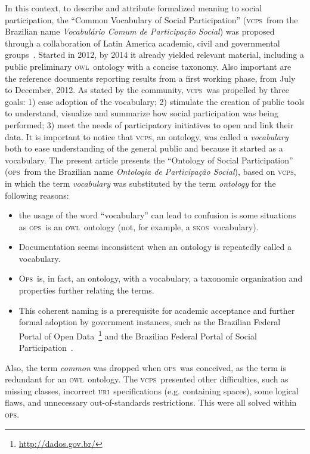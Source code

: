 \documentclass[10pt,letterpaper]{article}
\newcommand{\ops}{\textsc{ops}}
\newcommand{\opsi}{O\textsc{ps}}
\newcommand{\vcps}{\textsc{vcps}}
\newcommand{\owl}{\textsc{owl}}
\newcommand{\skos}{\textsc{skos}}
\newcommand{\uri}{\textsc{uri}}
\begin{document}
In this context, to describe and attribute formalized meaning to
social participation,
the ``Common Vocabulary of Social Participation''
(\vcps\ from the Brazilian name \emph{Vocabul\'ario Comum de Participa\c{c}\~ao Social})
was proposed through a collaboration of Latin America academic, civil and governmental groups~\cite{corais}.
Started in 2012, by 2014
it already yielded relevant material, including a public preliminary \owl\ ontology with a concise taxonomy.
Also important are the reference documents reporting results from a first working phase, from July to December, 2012. 
As stated by the community, \vcps\ was propelled by three goals:
1) ease adoption of the vocabulary;
2) stimulate the creation of public tools to understand, visualize and summarize how social participation was being performed;
3) meet the needs of participatory initiatives to open and link their data. 
It is important to notice that \vcps,
an ontology, was called a \emph{vocabulary} both to ease understanding of the general public and because it started as a vocabulary.
The present article presents the ``Ontology of Social Participation'' 
(\ops\ from the Brazilian name \emph{Ontologia de Participa\c{c}\~ao Social}),
based on \vcps, in which the term \emph{vocabulary} was substituted by the term \emph{ontology} for the following reasons:
\begin{itemize}
    \item the usage of the word ``vocabulary'' can lead to confusion is some situations as \ops\ is an \owl\ ontology
    (not, for example, a \skos\ vocabulary).
    \item Documentation seems inconsistent when an ontology is repeatedly called a vocabulary.
    \item \opsi\ is, in fact, an ontology, with a vocabulary,
    a taxonomic organization and properties further relating the terms.
    \item This coherent naming is a prerequisite for academic acceptance and further formal adoption by government instances,
    such as the Brazilian Federal Portal of Open Data~\footnote{\url{http://dados.gov.br/}} and the Brazilian Federal Portal of Social Participation~\cite{participa}.
\end{itemize}

\noindent Also, the term \emph{common} was dropped when \ops\ was conceived,
as the term is redundant for an \owl\ ontology.
The \vcps\ presented other difficulties, such as missing classes,
incorrect \uri\ specifications (e.g. containing spaces), some logical flaws,
and unnecessary out-of-standards restrictions.
This were all solved within \ops.
\end{document}
